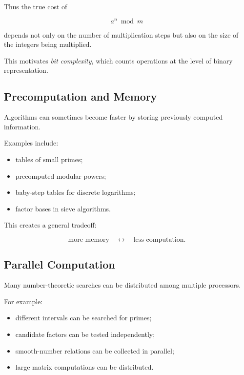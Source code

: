 Thus the true cost of

\[ a^n\bmod m \]

depends not only on the number of multiplication steps but also on the size
of the integers being multiplied.

This motivates \emph{bit complexity}, which counts operations at the level
of binary representation.

\subsection{Precomputation and Memory}
\label{subsec:precomputation-memory}

Algorithms can sometimes become faster by storing previously computed
information.

Examples include:

\begin{itemize}
    \item tables of small primes;
    \item precomputed modular powers;
    \item baby-step tables for discrete logarithms;
    \item factor bases in sieve algorithms.
\end{itemize}

This creates a general tradeoff:

\[ \boxed{\text{more memory}\quad\longleftrightarrow\quad\text{less computation}.} \]

\subsection{Parallel Computation}
\label{subsec:number-theory-parallel-computation}

Many number-theoretic searches can be distributed among multiple processors.

For example:

\begin{itemize}
    \item different intervals can be searched for primes;
    \item candidate factors can be tested independently;
    \item smooth-number relations can be collected in parallel;
    \item large matrix computations can be distributed.
\end{itemize}

